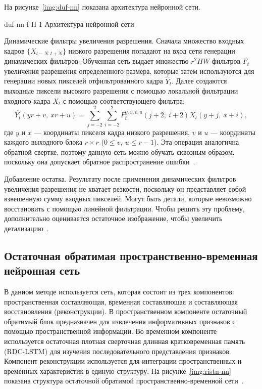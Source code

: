 \documentclass{bmstu}
\begin{document}
На рисунке~\ref{img:duf-nn} показана архитектура нейронной сети. 

    {duf-nn}
    {f}
    {H}
    {1\textwidth}
    {Архитектура нейронной сети~\cite{Younghyun2018}}
    
Динамические фильтры увеличения разрешения. 
Сначала множество входных кадров $\{X_{t - N:t + N}\}$ низкого разрешения попадают на вход сети генерации динамических фильтров. 
Обученная сеть выдает множество $r^{2}HW$ фильтров $F_t$ увеличения разрешения определенного размера, которые затем используются для генерации новых пикселей отфильтрованного кадра $\hat{Y}_t$. 
Далее создаются выходные пиксели высокого разрешения с помощью локальной фильтрации входного кадра $X_t$ с помощью соответствующего фильтра:
\begin{equation}
\hat{Y_t}(yr + v,~xr + u) = \sum_{j = -2}^{2} \sum_{i = -2}^{2} F^{y,x,v,u}_{t}(j + 2,~i + 2)X_{t}(y + j,~x + i),
\end{equation}
где $y$ и $x$ --- координаты пикселя кадра низкого разрешения, $v$ и $u$ --- координаты каждого выходного блока $r \times r$ ($0 \leq v,~u \leq r - 1$). 
Эта операция аналогична обратной свертке, поэтому данную сеть можно обучать сквозным образом, поскольку она допускает обратное распространение ошибки~\cite{Younghyun2018}.

Добавление остатка. 
Результату после применения динамических фильтров увеличения разрешения не хватает резкости, поскольку он представляет собой взвешенную сумму входных пикселей. 
Могут быть детали, которые невозможно восстановить с помощью линейной фильтрации. 
Чтобы решить эту проблему, дополнительно оценивается остаточное изображение, чтобы увеличить детализацию~\cite{Younghyun2018}.

\subsection{Остаточная обратимая пространственно-временная нейронная сеть}

В данном методе используется сеть, которая состоит из трех компонентов: пространственная составляющая, временная составляющая и составляющая восстановления (реконструкции). 
В пространственном компоненте остаточный обратимый блок предназначен для извлечения информативных признаков с помощью пространственной информации. 
Во временном компоненте используется остаточная плотная сверточная длинная кратковременная память (RDC-LSTM) для изучения последовательного представления признаков. 
Компонент реконструкции используется для интеграции пространственных и временных характеристик в единую структуру. 
На рисунке~\ref{img:ristn-nn} показана структура остаточной обратимой пространственно-временной сети~\cite{Xiaobin2019}.
\end{document}
